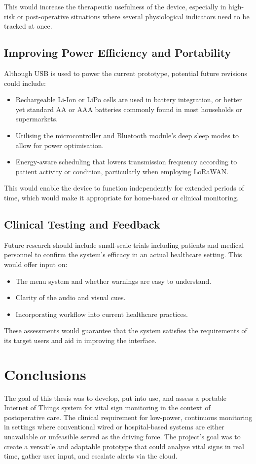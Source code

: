 This would increase the therapeutic usefulness of the device, especially in high-risk or post-operative situations where several physiological indicators need to be tracked at once.

\subsection{Improving Power Efficiency and Portability}
Although USB is used to power the current prototype, potential future revisions could include:

\begin{itemize}
	\item Rechargeable Li-Ion or LiPo cells are used in battery integration, or better yet standard AA or AAA batteries commonly found in most households or supermarkets.
	\item Utilising the microcontroller and Bluetooth module's deep sleep modes to allow for power optimisation.
	\item Energy-aware scheduling that lowers transmission frequency according to patient activity or condition, particularly when employing LoRaWAN.
\end{itemize}

This would enable the device to function independently for extended periods of time, which would make it appropriate for home-based or clinical monitoring.

\subsection{Clinical Testing and Feedback}
Future research should include small-scale trials including patients and medical personnel to confirm the system's efficacy in an actual healthcare setting. This would offer input on:

\begin{itemize}
	\item The menu system and whether warnings are easy to understand.
	\item Clarity of the audio and visual cues.
	\item Incorporating workflow into current healthcare practices.
\end{itemize}

These assessments would guarantee that the system satisfies the requirements of its target users and aid in improving the interface.

\section{Conclusions}
The goal of this thesis was to develop, put into use, and assess a portable Internet of Things system for vital sign monitoring in the context of postoperative care. The clinical requirement for low-power, continuous monitoring in settings where conventional wired or hospital-based systems are either unavailable or unfeasible served as the driving force. The project's goal was to create a versatile and adaptable prototype that could analyse vital signs in real time, gather user input, and escalate alerts via the cloud.

